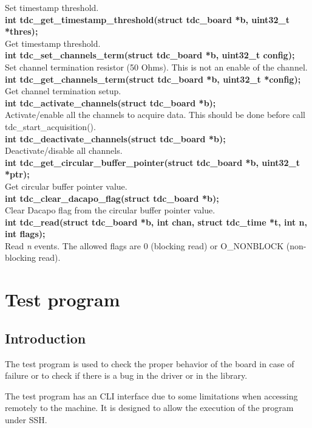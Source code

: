 \documentclass[a4paper,11pt]{article}
\begin{document}
Set timestamp threshold.\\
\textbf{int tdc\_get\_timestamp\_threshold(struct tdc\_board *b, uint32\_t *thres);} \\
Get timestamp threshold.\\
\textbf{int tdc\_set\_channels\_term(struct tdc\_board *b, uint32\_t config);} \\
Set channel termination resistor (50 Ohms). This is not an enable of the channel. \\
\textbf{int tdc\_get\_channels\_term(struct tdc\_board *b, uint32\_t *config);} \\
Get channel termination setup. \\
\textbf{int tdc\_activate\_channels(struct tdc\_board *b);} \\
Activate/enable all the channels to acquire data. This should be done before call tdc\_start\_acquisition(). \\
\textbf{int tdc\_deactivate\_channels(struct tdc\_board *b);} \\
Deactivate/disable all channels. \\
\textbf{int tdc\_get\_circular\_buffer\_pointer(struct tdc\_board *b, uint32\_t *ptr);} \\
Get circular buffer pointer value.\\
\textbf{int tdc\_clear\_dacapo\_flag(struct tdc\_board *b);} \\
Clear Dacapo flag from the circular buffer pointer value.\\
\textbf{int tdc\_read(struct tdc\_board *b, int chan, struct tdc\_time *t,
		    int n, int flags);} \\
Read \textit{n} events. The allowed flags are 0 (blocking read) or O\_NONBLOCK (non-blocking read).

\section{Test program}
\subsection{Introduction}
The test program is used to check the proper behavior of the board in case of failure or to check if there is a bug in the driver or in the library.

The test program has an CLI interface due to some limitations when accessing remotely to the machine. It is designed to allow the execution of the program under SSH.
\end{document}
